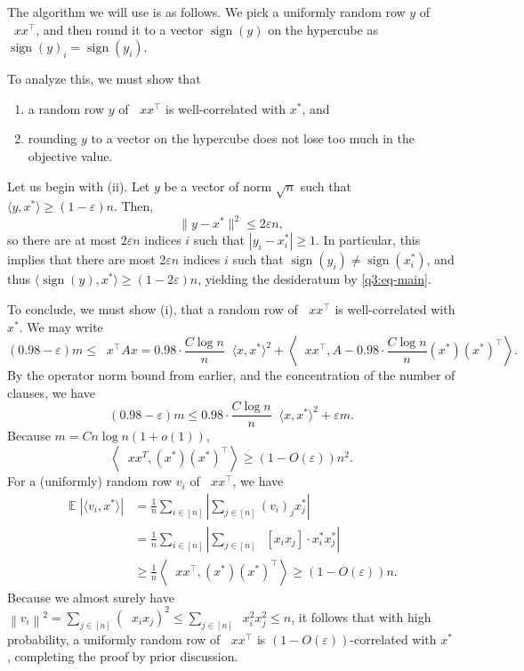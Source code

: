 \documentclass[11pt]{article}
\theoremstyle{definition}
\newcommand{\norm}[1]{\left\| #1 \right\|}
\renewcommand{\epsilon}{\varepsilon}
\newcommand{\eps}{\epsilon}
\DeclareMathOperator{\E}{\mathbb{E}} %
\DeclareMathOperator{\pE}{\widetilde{\mathbb{E}}} %
\newcommand{\sgn}{\operatorname{sign}}
\begin{document}
\begin{enumerate}[label=(\alph*)]
    The algorithm we will use is as follows. We pick a uniformly random row $y$ of $\pE xx^\top$, and then round it to a vector $\sgn(y)$ on the hypercube as $\sgn(y)_i = \sgn(y_i)$.

    To analyze this, we must show that
    \begin{enumerate}[label=(\roman*)]
      \item a random row $y$ of $\pE xx^\top$ is well-correlated with $x^*$, and
      \item rounding $y$ to a vector on the hypercube does not lose too much in the objective value.
    \end{enumerate}

    Let us begin with (ii). Let $y$ be a vector of norm $\sqrt{n}$ such that $\langle y,x^*\rangle \ge (1-\eps) n$. Then,
    \[ \|y-x^*\|^2 \le 2\eps n, \]
    so there are at most $2\eps n$ indices $i$ such that $|y_i - x_i^*| \ge 1$. In particular, this implies that there are most $2\eps n$ indices $i$ such that $\sgn(y_i) \ne \sgn(x_i^*)$, and thus $\langle \sgn(y) , x^* \rangle \ge (1-2\eps)n$, yielding the desideratum by \eqref{q3:eq-main}. 

    To conclude, we must show (i), that a random row of $\pE xx^\top$ is well-correlated with $x^*$. We may write
    \begin{equation}
      \nonumber
      (0.98-\eps) m \le \pE x^\top A x = 0.98 \cdot \frac{C \log n}{n} \pE \langle x , x^* \rangle^2 + \left\langle \pE xx^\top , A - 0.98 \cdot \frac{C\log n}{n} (x^*)(x^*)^\top \right\rangle.
    \end{equation}
    By the operator norm bound from earlier, and the concentration of the number of clauses, we have
    \[ (0.98 - \eps) m \le 0.98 \cdot \frac{C \log n}{n} \pE \langle x,x^*\rangle^2 + \eps m. \]
    Because $m = C n \log n (1+o(1))$,
    \[ \left\langle \pE xx^T , (x^*)(x^*)^\top \right\rangle \ge (1-O(\eps))n^2. \]
    For a (uniformly) random row $v_i$ of $\pE xx^\top$, we have
    \begin{align*}
      \E |\langle v_i , x^*\rangle| &= \frac{1}{n} \sum_{i \in [n]} \left| \sum_{j \in [n]} (v_i)_j x^*_j \right| \\
        &= \frac{1}{n} \sum_{i \in [n]} \left| \sum_{j \in [n]} \pE [x_i x_j] \cdot x^*_i x^*_j \right| \\
        &\ge \frac{1}{n} \left\langle \pE xx^\top , (x^*)(x^*)^\top \right\rangle \ge (1-O(\eps))n.
    \end{align*}
    Because we almost surely have $\norm{v_i}^2 = \sum_{j \in [n]} \left(\pE x_ix_j\right)^2 \le \sum_{j \in [n]} \pE x_i^2 x_j^2 \le n$, it follows that with high probability, a uniformly random row of $\pE xx^\top$ is $(1-O(\eps))$-correlated with $x^*$, completing the proof by prior discussion.


  \end{enumerate}
\end{document}
